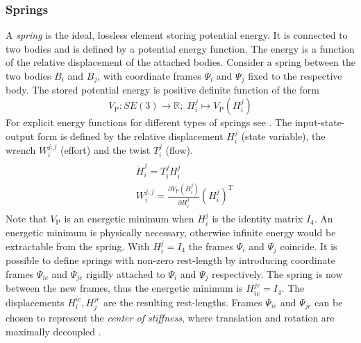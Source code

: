 \documentclass[a4paper,twoside, openright,12pt]{report}
\newcommand{\g}[1]{\text{#1}}
\begin{document}
\subsubsection{Springs}
A \emph{spring} is the ideal, lossless element storing potential energy. It is connected to two bodies and is defined by a potential energy function. The energy is a function of the relative displacement of the attached bodies. Consider a spring between the two bodies $ B_i $ and $ B_j $,  with coordinate frames $ \Psi_i $ and $ \Psi_j $ fixed to the respective body. The stored potential energy is positive definite function of the form 
\begin{equation}\label{EQ:SpringEnergyFunction}
	V_{\g{P}} : SE(3) \rightarrow \mathbb{R}; \; H_i^j \mapsto V_{\g{P}}(H_i^j)
\end{equation}
For explicit energy functions for different types of springs see \cite{Stramigioli_01}.
The input-state-output form is defined by the relative displacement $H_i^j$ (state variable), the wrench $W_i^{j,j}$ (effort) and the twist $T_i^j$ (flow).
\begin{eqnarray}
\begin{aligned}
	&\dot{H}_i^j = T_i^{j}H_i^j\\
	&W_i^{j,j} = \frac{\partial V_{\g{P}}(H_i^j)}{\partial H_i^j}(H_i^j)^T
\end{aligned}
\end{eqnarray}
Note that $ V_{\g{P}} $ is an energetic minimum when $ H_i^j $ is the identity matrix $I_4$. An energetic minimum is physically necessary, otherwise infinite energy would be extractable from the spring. With $ H_i^j = I_4 $ the frames $ \Psi_i $ and $\Psi_j$ coincide.
It is possible to define springs with non-zero rest-length by introducing coordinate frames $ \Psi_{ic} $ and $\Psi_{jc}$ rigidly attached to $ \Psi_i $ and $\Psi_j$ respectively. The spring is now between the new frames, thus the energetic minimum is $H_{ic}^{jc} = I_4$. The displacements $ H_i^{ic}, H_j^{jc} $ are the resulting rest-lengths. Frames $ \Psi_{ic} $ and $\Psi_{jc}$ can be chosen to represent the \emph{center of stiffness}, where translation and rotation are maximally decoupled \cite{Stramigioli_99}.
\end{document}
